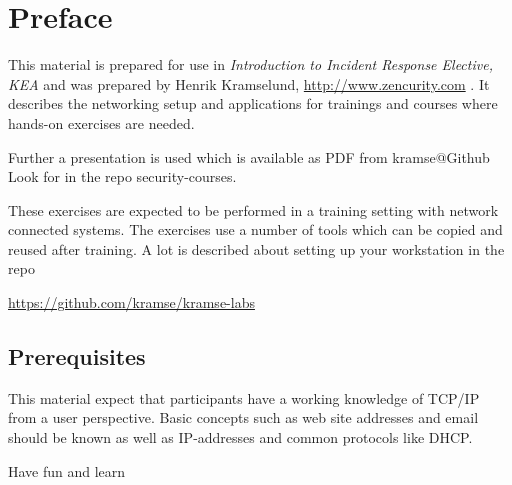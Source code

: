 \documentclass[a4paper,11pt,notitlepage]{report}
\begin{document}
{}

\newcommand{\kursus}[1]{Introduction to Incident Response Elective, KEA}
\newcommand{\kursusnavn}[1]{Introduction to Incident Response Elective, KEA\\ exercises}


\setcounter{tocdepth}{0}

\normal

{\color{titlecolor}\tableofcontents}

\normal
\pagestyle{fancyplain}
\chapter*{\color{titlecolor}Preface}

This material is prepared for use in \emph{Introduction to Incident Response Elective, KEA} and was prepared by
Henrik Kramselund, \url{http://www.zencurity.com} .
It describes the networking setup and
applications for trainings and courses where hands-on exercises are needed.

Further a presentation is used which is available as PDF from kramse@Github\\
Look for \jobname in the repo security-courses.

These exercises are expected to be performed in a training setting with network connected systems. The exercises use a number of tools which can be copied and reused after training. A lot is described about setting up your workstation in the repo

\url{https://github.com/kramse/kramse-labs}


\section*{\color{titlecolor}Prerequisites}

This material expect that participants have a working knowledge of
TCP/IP from a user perspective. Basic concepts such as web site addresses and email should be known as well as IP-addresses and common protocols like DHCP.

\vskip 1cm
Have fun and learn
\eject

\rhead{\fancyplain{}{\bf \chaptername\ \thechapter}}
\end{document}
